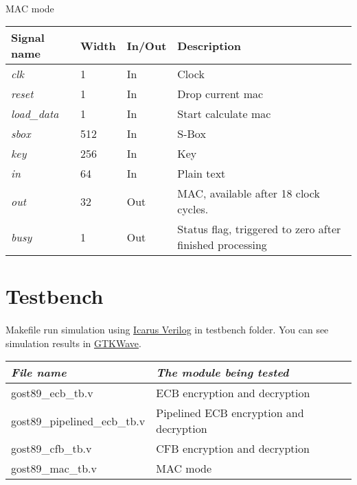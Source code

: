 \documentclass[a4paper,12pt]{article}
\begin{document}
\paragraph{}
MAC mode\\
{\renewcommand{\arraystretch}{1.2}
\begin{tabularx}{\textwidth}{l|l l X}
\hline
Signal name & Width & In/Out & Description\\
\hline
\textsl{clk}        & 1   & In  & Clock\\
\textsl{reset}      & 1   & In  & Drop current mac \\
\textsl{load\_data} & 1   & In  & Start calculate mac \\
\textsl{sbox}       & 512 & In  & S-Box \\
\textsl{key}        & 256 & In  & Key \\
\textsl{in}         & 64  & In  & Plain text \\
\textsl{out}        & 32  & Out & MAC, available after 18 clock cycles. \\
\textsl{busy}       & 1   & Out & Status flag, triggered to zero after finished processing\\
\hline
\end{tabularx}}


\newpage
\section{Testbench}

\paragraph{}
Makefile run simulation using
\href{http://iverilog.icarus.com/}{Icarus Verilog}
in testbench folder. You can see simulation results in
\href{http://gtkwave.sourceforge.net/}{GTKWave}.

\begin{flushleft}
{\renewcommand{\arraystretch}{1.5}
\begin{tabularx}{\textwidth}{l|X}
\hline
\textsl{File name} & \textsl{The module being tested}\\
\hline
gost89\_ecb\_tb.v & ECB encryption and decryption\\
\hline
gost89\_pipelined\_ecb\_tb.v & Pipelined ECB encryption and decryption\\
\hline
gost89\_cfb\_tb.v & CFB encryption and decryption\\
\hline
gost89\_mac\_tb.v & MAC mode\\
\hline
\end{tabularx}}
\end{flushleft}
\end{document}
